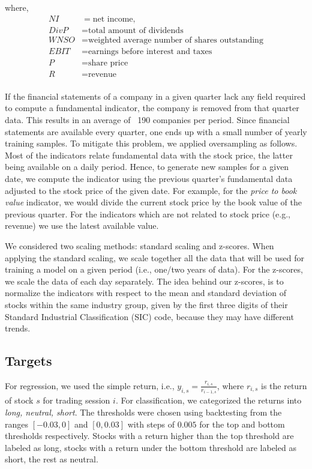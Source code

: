 where,
\begin{align*}
    NI &= \text{net income}, \\
    DivP &= \text{total amount of dividends} \\
    WNSO &= \text{weighted average number of shares outstanding} \\
    EBIT &= \text{earnings before interest and taxes} \\
    P &= \text{share price} \\
    R &= \text{revenue} \\
\end{align*}


If the financial statements of a company in a given quarter lack any field required to compute a fundamental indicator, the company is removed from that quarter data. This results in an average of ~190 companies per period.
Since financial statements are available every quarter, one ends up with a small number of yearly training samples.
To mitigate this problem, we applied oversampling as follows. Most of the indicators relate fundamental data with the stock price, the latter being available on a daily period.
Hence, to generate new samples for a given date, we compute the indicator using the previous quarter's fundamental data adjusted to the stock price of the given date. For example, for the \textit{price to book value} indicator, we would divide the current stock price by the book value of the previous quarter. For the indicators which are not related to stock price (e.g., revenue) we use the latest available value.

We considered two scaling methods: standard scaling and z-scores. When applying the standard scaling, we scale together all the data that will be used for training a model on a given period (i.e., one/two years of data). For the z-scores, we scale the data of each day separately. The idea behind our z-scores, is to normalize the indicators with respect to the mean and standard deviation of stocks within the same industry group, given by the first three digits of their Standard Industrial Classification (SIC) code, because they may have different trends.

\subsection{Targets}

For regression, we used the simple return, i.e., $y_{i, s} = \frac{r_{i, s}}{r_{i-1, s}}$, where $r_{i, s}$ is the return of stock $s$ for trading session $i$.
For classification, we categorized the returns into \textit{long, neutral, short}. The thresholds were chosen using backtesting from the ranges $[-0.03, 0]$ and $[0, 0.03]$ with steps of $0.005$ for the top and bottom thresholds respectively. Stocks with a return higher than the top threshold are labeled as long, stocks with a return under the bottom threshold are labeled as short, the rest as neutral. 


